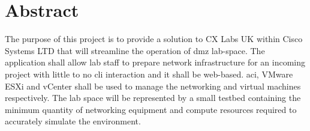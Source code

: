 \section*{Abstract}
The purpose of this project is to provide a solution to CX Labs UK within
  Cisco Systems LTD that will streamline the operation of \gls{dmz} lab-space. The
  application shall allow lab staff to prepare network infrastructure for an
  incoming project with little to no \gls{cli} interaction and it shall be web-based.
  \gls{aci}, VMware ESXi and vCenter shall be used to manage the networking and virtual
  machines respectively. The lab space will be represented by a small testbed
  containing the minimum quantity of networking equipment and compute resources
  required to accurately simulate the environment.
